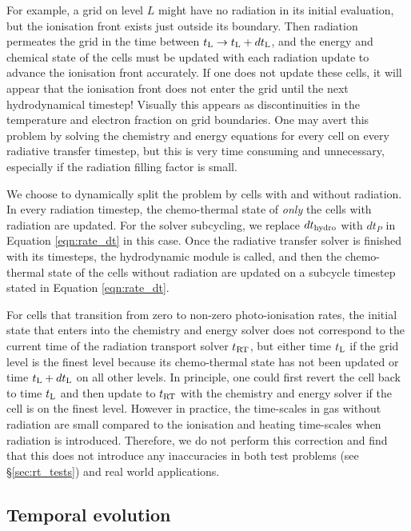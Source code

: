\documentclass[useAMS,usenatbib]{mn2e}
\begin{document}
For example, a grid on level $L$ might have no radiation in its
initial evaluation, but the ionisation front exists just outside its
boundary.  Then radiation permeates the grid in the time between
$t_{\rm L} \rightarrow t_{\rm L}+dt_{\rm L}$, and the energy and
chemical state of the cells must be updated with each radiation update
to advance the ionisation front accurately.  If one does not update
these cells, it will appear that the ionisation front does not enter
the grid until the next hydrodynamical timestep!  Visually this
appears as discontinuities in the temperature and electron fraction on
grid boundaries.  One may avert this problem by solving the chemistry
and energy equations for every cell on every radiative transfer
timestep, but this is very time consuming and unnecessary, especially
if the radiation filling factor is small.

We choose to dynamically split the problem by cells with and without
radiation.  In every radiation timestep, the chemo-thermal state of
\textit{only} the cells with radiation are updated.  For the solver
subcycling, we replace $dt_{\rm hydro}$ with $dt_P$ in Equation
\ref{eqn:rate_dt} in this case.  Once the radiative transfer solver is
finished with its timesteps, the hydrodynamic module is called, and
then the chemo-thermal state of the cells without radiation are
updated on a subcycle timestep stated in Equation \ref{eqn:rate_dt}.

For cells that transition from zero to non-zero photo-ionisation
rates, the initial state that enters into the chemistry and energy
solver does not correspond to the current time of the radiation
transport solver $t_{\rm RT}$, but either time $t_{\rm L}$ if the grid
level is the finest level because its chemo-thermal state has not been
updated or time $t_{\rm L}+dt_{\rm L}$ on all other levels.  In
principle, one could first revert the cell back to time $t_{\rm L}$
and then update to $t_{\rm RT}$ with the chemistry and energy solver
if the cell is on the finest level.  However in practice, the
time-scales in gas without radiation are small compared to the
ionisation and heating time-scales when radiation is introduced.
Therefore, we do not perform this correction and find that this does
not introduce any inaccuracies in both test problems (see
\S\ref{sec:rt_tests}) and real world applications.


\subsection{Temporal evolution}
\label{sec:timestepping}
\end{document}
